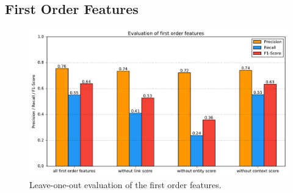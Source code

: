 \subsection{First Order Features}
\begin{figure}[H]
	\centering
	\includegraphics[width=\textwidth]{img/first_order_eval}
	\caption{Leave-one-out evaluation of the first order features.}
	\label{fo_eval}
\end{figure}
